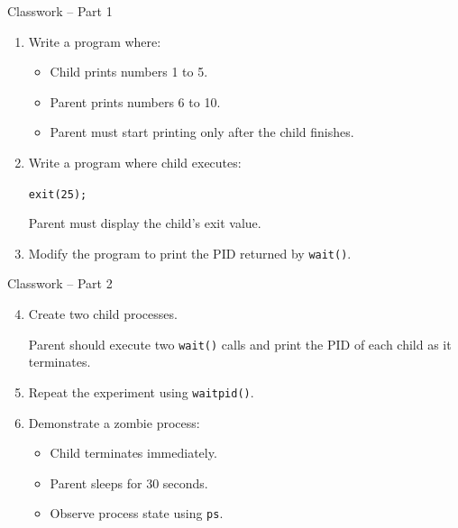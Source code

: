 \documentclass[aspectratio=169]{beamer}
\begin{document}
\begin{frame}{Classwork -- Part 1}

\begin{enumerate}

    \item Write a program where:
    \begin{itemize}
        \item Child prints numbers 1 to 5.
        \item Parent prints numbers 6 to 10.
        \item Parent must start printing only after the child finishes.
    \end{itemize}

    \item Write a program where child executes:
    \begin{center}
    \texttt{exit(25);}
    \end{center}

    Parent must display the child's exit value.

    \item Modify the program to print the PID returned by
    \texttt{wait()}.

\end{enumerate}

\end{frame}

\begin{frame}{Classwork -- Part 2}

\begin{enumerate}

\setcounter{enumi}{3}

    \item Create two child processes.

    Parent should execute two \texttt{wait()} calls and print the PID of each
    child as it terminates.

    \item Repeat the experiment using \texttt{waitpid()}.

    \item Demonstrate a zombie process:
    \begin{itemize}
        \item Child terminates immediately.
        \item Parent sleeps for 30 seconds.
        \item Observe process state using \texttt{ps}.
    \end{itemize}

\end{enumerate}

\end{frame}
\end{document}
